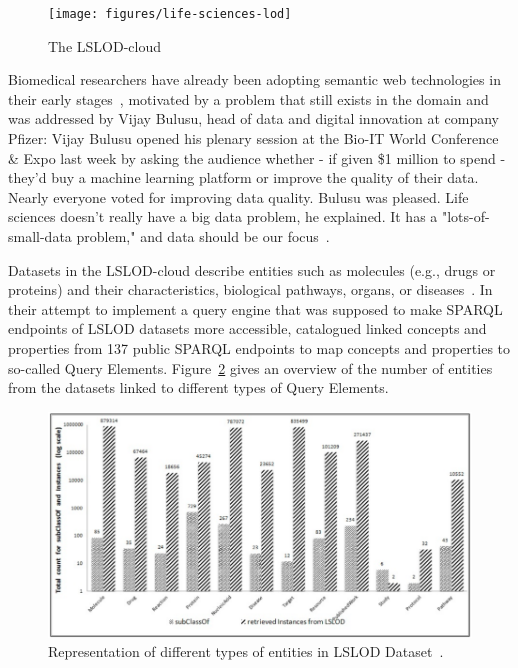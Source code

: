 \documentclass[runningheads]{llncs}
\newenvironment{nbquote} {\quote\interlinepenalty=10000 } {\endquote}
\begin{document}
    \begin{figure}[ht]
        \centering
        \texttt{[image: figures/life-sciences-lod]}
        \caption{The LSLOD-cloud\protect\footnotemark[\value{footnote}]}
        \label{fig:lslod_cloud}
    \end{figure}

    Biomedical researchers have already been adopting semantic web technologies in their early stages~\citep{ashburner2000gene, bodenreider2004unified, wang2005xml}, motivated by a problem that still exists in the domain and was addressed by Vijay Bulusu, head of data and digital innovation at company Pfizer:
    \begin{nbquote}
        Vijay Bulusu opened his plenary session at the Bio-IT World Conference \& Expo last week by asking the audience whether - if given \$1 million to spend - they'd buy a machine learning platform or improve the quality of their data.
        Nearly everyone voted for improving data quality.
        Bulusu was pleased.
        Life sciences doesn't really have a big data problem, he explained.
        It has a "lots-of-small-data problem," and data should be our focus~\citep{Pfizer}.
    \end{nbquote}

    Datasets in the LSLOD-cloud describe entities such as molecules (e.g., drugs or proteins) and their characteristics, biological pathways, organs, or diseases~\citep{bodenreider2008biomedical}.
    In their attempt to implement a query engine that was supposed to make SPARQL endpoints of LSLOD datasets more accessible, \citet{kamdar2014roadmap} catalogued linked concepts and properties from 137 public SPARQL endpoints to map concepts and properties to so-called Query Elements.
    Figure~\ref{fig:lslod_entities} gives an overview of the number of entities from the datasets linked to different types of Query Elements.

    \begin{figure}[ht]
        \centering
        \includegraphics[width=\textwidth]{figures/lslod_entities}
        \caption{Representation of different types of entities in LSLOD Dataset~\citep{kamdar2014roadmap}.}
        \label{fig:lslod_entities}
    \end{figure}
\end{document}
